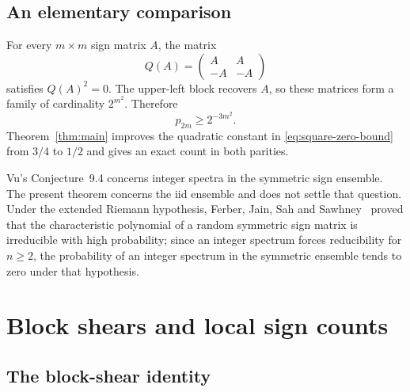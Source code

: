 \documentclass[11pt]{amsart}
\theoremstyle{definition}
\theoremstyle{remark}
\numberwithin{equation}{section}
\begin{document}
\subsection{An elementary comparison}

For every $m\times m$ sign matrix $A$, the matrix
\begin{equation}\label{eq:square-zero}
 Q(A)=\begin{pmatrix}A&A\\-A&-A\end{pmatrix}
\end{equation}
satisfies $Q(A)^2=0$. The upper-left block recovers $A$, so these matrices form a family of cardinality $2^{m^2}$. Therefore
\begin{equation}\label{eq:square-zero-bound}
 p_{2m}\geq2^{-3m^2}.
\end{equation}
Theorem~\ref{thm:main} improves the quadratic constant in \eqref{eq:square-zero-bound} from $3/4$ to $1/2$ and gives an exact count in both parities.

Vu's Conjecture~9.4 concerns integer spectra in the symmetric sign ensemble. The present theorem concerns the iid ensemble and does not settle that question. Under the extended Riemann hypothesis, Ferber, Jain, Sah and Sawhney~\cite{FJSS23} proved that the characteristic polynomial of a random symmetric sign matrix is irreducible with high probability; since an integer spectrum forces reducibility for $n\geq2$, the probability of an integer spectrum in the symmetric ensemble tends to zero under that hypothesis.

\section{Block shears and local sign counts}\label{sec:local}

\subsection{The block-shear identity}
\end{document}
